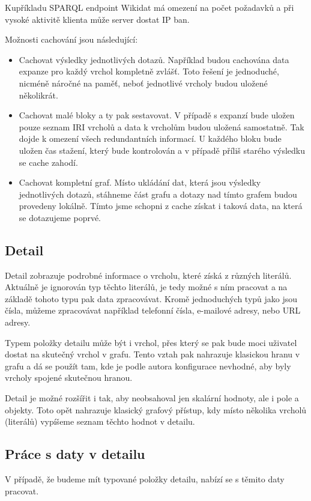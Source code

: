 Kupříkladu SPARQL endpoint Wikidat má omezení na počet požadavků a při vysoké aktivitě klienta může server dostat IP ban.

Možnosti cachování jsou následující:
\begin{itemize}
    \item Cachovat výsledky jednotlivých dotazů. Například budou cachována data expanze pro každý vrchol kompletně zvlášť. Toto řešení je jednoduché, nicméně náročné na paměť, neboť jednotlivé vrcholy budou uložené několikrát.
    \item Cachovat malé bloky a ty pak sestavovat. V případě s expanzí bude uložen pouze seznam IRI vrcholů a data k vrcholům budou uložená samostatně. Tak dojde k omezení všech redundantních informací. U každého bloku bude uložen čas stažení, který bude kontrolován a v případě příliš starého výsledku se cache zahodí.
    \item Cachovat kompletní graf. Místo ukládání dat, která jsou výsledky jednotlivých dotazů, stáhneme část grafu a dotazy nad tímto grafem budou provedeny lokálně. Tímto jsme schopni z cache získat i taková data, na která se dotazujeme poprvé.
\end{itemize}

\subsection*{Detail}
Detail zobrazuje podrobné informace o vrcholu, které získá z různých literálů. Aktuálně je ignorován typ těchto literálů, je tedy možné s ním pracovat a na základě tohoto typu pak data zpracovávat. Kromě jednoduchých typů jako jsou čísla, můžeme zpracovávat například telefonní čísla, e-mailové adresy, nebo URL adresy.

Typem položky detailu může být i vrchol, přes který se pak bude moci uživatel dostat na skutečný vrchol v grafu. Tento vztah pak nahrazuje klasickou hranu v grafu a dá se použít tam, kde je podle autora konfigurace nevhodné, aby byly vrcholy spojené skutečnou hranou.

Detail je možné rozšířit i tak, aby neobsahoval jen skalární hodnoty, ale i pole a objekty. Toto opět nahrazuje klasický grafový přístup, kdy místo několika vrcholů (literálů) vypíšeme seznam těchto hodnot v detailu.

\subsection*{Práce s daty v detailu}
V případě, že budeme mít typované položky detailu, nabízí se s těmito daty pracovat.

